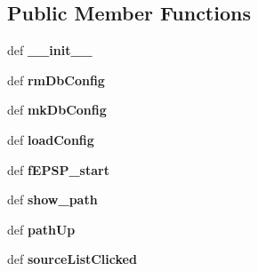 \subsection*{Public Member Functions}
\begin{DoxyCompactItemize}
\item 
\hypertarget{classmain_1_1f_e_p_s_p__gui_1_1_my_form_a4a6670ae930e5066b29bb371a8d64ee1}{def {\bfseries \-\_\-\-\_\-init\-\_\-\-\_\-}}\label{classmain_1_1f_e_p_s_p__gui_1_1_my_form_a4a6670ae930e5066b29bb371a8d64ee1}

\item 
\hypertarget{classmain_1_1f_e_p_s_p__gui_1_1_my_form_a24f53a56a099522278fed7f8dadf3331}{def {\bfseries rm\-Db\-Config}}\label{classmain_1_1f_e_p_s_p__gui_1_1_my_form_a24f53a56a099522278fed7f8dadf3331}

\item 
\hypertarget{classmain_1_1f_e_p_s_p__gui_1_1_my_form_a229b335236690eaba3d1eba760f262e2}{def {\bfseries mk\-Db\-Config}}\label{classmain_1_1f_e_p_s_p__gui_1_1_my_form_a229b335236690eaba3d1eba760f262e2}

\item 
\hypertarget{classmain_1_1f_e_p_s_p__gui_1_1_my_form_a2ee046e789a670744373085ef75e3b0b}{def {\bfseries load\-Config}}\label{classmain_1_1f_e_p_s_p__gui_1_1_my_form_a2ee046e789a670744373085ef75e3b0b}

\item 
\hypertarget{classmain_1_1f_e_p_s_p__gui_1_1_my_form_adae67113d3ba9f7e84eda40223376aea}{def {\bfseries f\-E\-P\-S\-P\-\_\-start}}\label{classmain_1_1f_e_p_s_p__gui_1_1_my_form_adae67113d3ba9f7e84eda40223376aea}

\item 
\hypertarget{classmain_1_1f_e_p_s_p__gui_1_1_my_form_a42e06a0d58df1b05811ff6fea35fc8ee}{def {\bfseries show\-\_\-path}}\label{classmain_1_1f_e_p_s_p__gui_1_1_my_form_a42e06a0d58df1b05811ff6fea35fc8ee}

\item 
\hypertarget{classmain_1_1f_e_p_s_p__gui_1_1_my_form_a1a87d83b94e6106053b21d618bb135de}{def {\bfseries path\-Up}}\label{classmain_1_1f_e_p_s_p__gui_1_1_my_form_a1a87d83b94e6106053b21d618bb135de}

\item 
\hypertarget{classmain_1_1f_e_p_s_p__gui_1_1_my_form_acd5111f1804d271f3c47688a645fd184}{def {\bfseries source\-List\-Clicked}}\label{classmain_1_1f_e_p_s_p__gui_1_1_my_form_acd5111f1804d271f3c47688a645fd184}


\end{DoxyCompactItemize}
